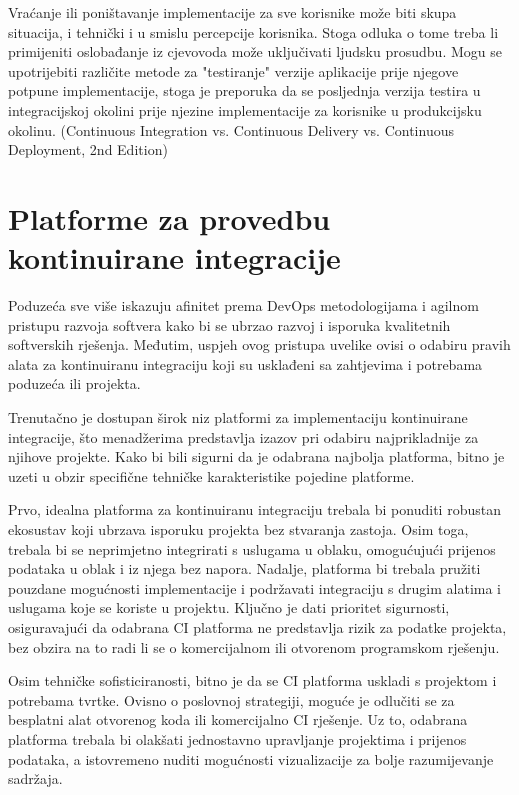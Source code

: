 \documentclass[a4paper,12pt,oneside]{article}
\begin{document}
Vraćanje ili poništavanje implementacije za sve korisnike može biti skupa situacija, i tehnički i u smislu percepcije korisnika. Stoga odluka o tome treba li primijeniti oslobađanje iz cjevovoda može uključivati ljudsku prosudbu. Mogu se upotrijebiti različite metode za "testiranje" verzije aplikacije prije njegove potpune implementacije, stoga je preporuka da se posljednja verzija testira u integracijskoj okolini prije njezine implementacije za korisnike u produkcijsku okolinu. 
(Continuous Integration vs. Continuous Delivery vs. Continuous Deployment, 2nd Edition)

\newpage

\section{Platforme za provedbu kontinuirane integracije}

 Poduzeća sve više iskazuju afinitet prema DevOps metodologijama i agilnom pristupu razvoja softvera kako bi se ubrzao razvoj i isporuka kvalitetnih softverskih rješenja. Međutim, uspjeh ovog pristupa uvelike ovisi o odabiru pravih alata za kontinuiranu integraciju koji su usklađeni sa zahtjevima i potrebama poduzeća ili projekta.

Trenutačno je dostupan širok niz platformi za implementaciju kontinuirane integracije, što menadžerima predstavlja izazov pri odabiru najprikladnije za njihove projekte. Kako bi bili sigurni da je odabrana najbolja platforma, bitno je uzeti u obzir specifične tehničke karakteristike pojedine platforme.

Prvo, idealna platforma za kontinuiranu integraciju trebala bi ponuditi robustan ekosustav koji ubrzava isporuku projekta bez stvaranja zastoja. Osim toga, trebala bi se neprimjetno integrirati s uslugama u oblaku, omogućujući prijenos podataka u oblak i iz njega bez napora. Nadalje, platforma bi trebala pružiti pouzdane mogućnosti implementacije i podržavati integraciju s drugim alatima i uslugama koje se koriste u projektu. Ključno je dati prioritet sigurnosti, osiguravajući da odabrana CI platforma ne predstavlja rizik za podatke projekta, bez obzira na to radi li se o komercijalnom ili otvorenom programskom rješenju.

Osim tehničke sofisticiranosti, bitno je da se CI platforma uskladi s projektom i potrebama tvrtke. Ovisno o poslovnoj strategiji, moguće je odlučiti se za besplatni alat otvorenog koda ili komercijalno CI rješenje. Uz to, odabrana platforma trebala bi olakšati jednostavno upravljanje projektima i prijenos podataka, a istovremeno nuditi mogućnosti vizualizacije za bolje razumijevanje sadržaja.
\end{document}
